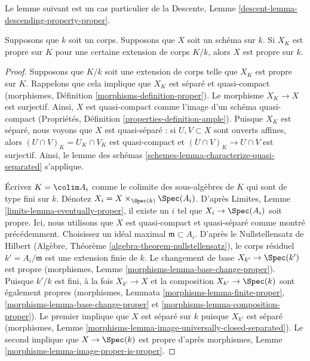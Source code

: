 \noindent
Le lemme suivant est un cas particulier de la Descente,
Lemme \ref{descent-lemma-descending-property-proper}.

\begin{lemma}
\label{lemma-proper-after-field-extension}
Supposons que $k$ soit un corps. Supposons que $X$ soit un
schéma sur $k$. Si $X_K$ est propre sur $K$ pour une
certaine extension de corps $K/k$, alors $X$ est propre sur $k$.
\end{lemma}

\begin{proof}
Supposons que $K/k$ soit une extension de corps telle que $X_K$ est
propre sur $K$. Rappelons que cela implique que $X_K$ est séparé et
quasi-compact (morphismes, Définition
\ref{morphisms-definition-proper}). Le morphisme $X_K \to X$ est
surjectif. Ainsi, $X$ est quasi-compact comme l'image d'un schéma
quasi-compact (Propriétés, Définition \ref{properties-definition-ample}).
Puisque $X_K$ est séparé, nous voyons que $X$ est quasi-séparé : si $U, V
\subset X$ sont ouverts affines, alors $(U \cap V)_K = U_K \cap V_K$ est
quasi-compact et $(U \cap V)_K \to U \cap V$ est surjectif. Ainsi, le
lemme des schémas \ref{schemes-lemma-characterize-quasi-separated} s'applique.

\medskip\noindent
Écrivez $K = \colim A_i$ comme le colimite des
sous-algèbres de $K$ qui sont de type fini sur $k$.
Dénotez $X_i = X \times_{\Spec(k)} \Spec(A_i)$. D'après
Limites, Lemme \ref{limits-lemma-eventually-proper}, il
existe un $i$ tel que $X_i \to \Spec(A_i)$ soit propre.
Ici, nous utilisons que $X$ est quasi-compact et
quasi-séparé comme montré précédemment. Choisissez un
idéal maximal $\mathfrak m \subset A_i$. D'après le
Nullstellensatz de Hilbert (Algèbre, Théorème
\ref{algebra-theorem-nullstellensatz}), le corps résiduel
$k' = A_i/\mathfrak m$ est une extension finie de $k$. Le
changement de base $X_{k'} \to \Spec(k')$ est propre
(morphismes, Lemme
\ref{morphisms-lemma-base-change-proper}). Puisque $k'/k$ est
fini, à la fois $X_{k'} \to X$ et la composition $X_{k'} \to
\Spec(k)$ sont également propres (morphismes, Lemmata
\ref{morphisms-lemma-finite-proper},
\ref{morphisms-lemma-base-change-proper} et
\ref{morphisms-lemma-composition-proper}). Le premier implique que $X$ est
séparé sur $k$ puisque $X_{k'}$ est séparé (morphismes, Lemme
\ref{morphisms-lemma-image-universally-closed-separated}). Le second implique que $X \to
\Spec(k)$ est propre d'après morphismes, Lemme \ref{morphisms-lemma-image-proper-is-proper}.
\end{proof}

